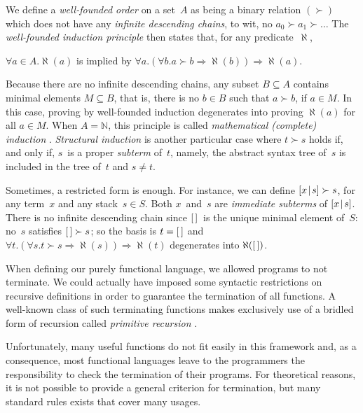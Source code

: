 We define a \emph{well\hyp{}founded order}
\citep{Winskel_1993} on a
set~\(A\) as being a binary relation \((\succ)\) which does not have
any \emph{infinite descending chains}, to wit, no \(a_0 \succ a_1 \succ \dots\) The
\emph{well\hyp{}founded induction principle} then states that, for any
predicate~\(\aleph\),
\begin{center}
  \(\forall a \in A.\aleph(a)\) is implied by \(\forall a.(\forall b.a
  \succ b \Rightarrow \aleph(b)) \Rightarrow \aleph(a)\).
\end{center}
Because there are no infinite descending chains, any
subset \(B \subseteq A\) contains minimal elements \(M \subseteq B\),
that is, there is no \(b \in B\) such that \(a \succ b\), if \(a \in
M\). In this case, proving by well\hyp{}founded induction degenerates
into proving \(\aleph(a)\) for all \(a \in M\). When \(A=\mathbb{N}\),
this principle is called \emph{mathematical (complete) induction}
\citep{Buck_1963}. \emph{Structural induction} is another particular case where \(t \succ s\) holds if, and
only if, \(s\)~is a proper
\emph{subterm}
of~\(t\), namely, the abstract syntax tree of~\(s\) is included in the
tree of~\(t\) and \(s \neq t\).

Sometimes, a restricted form is enough. For instance, we can define
\([{x}\!\mid\!{s}] \succ s\), for any term~\(x\)
and any stack~\(s \in S\). Both \(x\)~and~\(s\) are \emph{immediate
  subterms} of
\([{x}\!\mid\!{s}]\). There is no infinite
descending chain since \([\,]\)~is the unique minimal element of~\(S\):
no~\(s\) satisfies \([\,] \succ s\); so the basis is \(t=[\,]\) and
\(\forall t.(\forall s.t \succ s \Rightarrow \aleph(s)) \Rightarrow
\aleph(t)\) degenerates into \(\aleph([\,])\).

\label{par:ackermann}
When defining our purely functional language, we allowed programs to
not terminate. We could actually have imposed some syntactic
restrictions on recursive definitions in order to guarantee the
termination of all functions. A well\hyp{}known class of such
terminating functions makes exclusively use of a bridled form of
recursion called \emph{primitive recursion}
\citep{Robinson_1947,Robinson_1948}.

Unfortunately, many useful functions do not fit easily in this
framework and, as a consequence, most functional languages leave to
the programmers the responsibility to check the termination of their
programs. For theoretical reasons, it is not possible to provide a
general criterion for termination, but many standard rules exists that
cover many usages.

